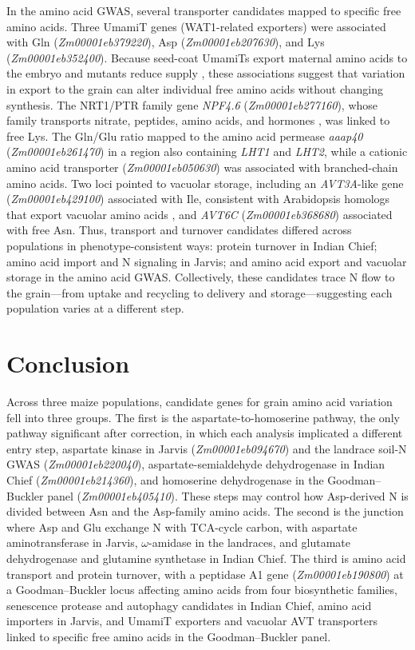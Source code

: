 \documentclass[namedate,unnumsec,webpdf,contemporary,large]{oup-authoring-template}
\begin{document}
In the amino acid GWAS, several transporter candidates mapped to specific free amino acids. Three UmamiT genes (WAT1-related exporters) were associated with Gln (\textit{Zm00001eb379220}), Asp (\textit{Zm00001eb207630}), and Lys (\textit{Zm00001eb352400}). Because seed-coat UmamiTs export maternal amino acids to the embryo and mutants reduce supply \citep{Muller2015UmamiT}, these associations suggest that variation in export to the grain can alter individual free amino acids without changing synthesis. The NRT1/PTR family gene \textit{NPF4.6} (\textit{Zm00001eb277160}), whose family transports nitrate, peptides, amino acids, and hormones \citep{Leran2014NPF}, was linked to free Lys. The Gln/Glu ratio mapped to the amino acid permease \textit{aaap40} (\textit{Zm00001eb261470}) in a region also containing \textit{LHT1} and \textit{LHT2}, while a cationic amino acid transporter (\textit{Zm00001eb050630}) was associated with branched-chain amino acids. Two loci pointed to vacuolar storage, including an \textit{AVT3A}-like gene (\textit{Zm00001eb429100}) associated with Ile, consistent with Arabidopsis homologs that export vacuolar amino acids \citep{Fujiki2017AtAVT3}, and \textit{AVT6C} (\textit{Zm00001eb368680}) associated with free Asn. Thus, transport and turnover candidates differed across populations in phenotype-consistent ways: protein turnover in Indian Chief; amino acid import and N signaling in Jarvis; and amino acid export and vacuolar storage in the amino acid GWAS. Collectively, these candidates trace N flow to the grain—from uptake and recycling to delivery and storage—suggesting each population varies at a different step.

\section{Conclusion}

Across three maize populations, candidate genes for grain amino acid variation fell into three groups. The first is the aspartate-to-homoserine pathway, the only pathway significant after correction, in which each analysis implicated a different entry step, aspartate kinase in Jarvis (\textit{Zm00001eb094670}) and the landrace soil-N GWAS (\textit{Zm00001eb220040}), aspartate-semialdehyde dehydrogenase in Indian Chief (\textit{Zm00001eb214360}), and homoserine dehydrogenase in the Goodman--Buckler panel (\textit{Zm00001eb405410}). These steps may control how Asp-derived N is divided between Asn and the Asp-family amino acids. The second is the junction where Asp and Glu exchange N with TCA-cycle carbon, with aspartate aminotransferase in Jarvis, $\omega$-amidase in the landraces, and glutamate dehydrogenase and glutamine synthetase in Indian Chief. The third is amino acid transport and protein turnover, with a peptidase A1 gene (\textit{Zm00001eb190800}) at a Goodman--Buckler locus affecting amino acids from four biosynthetic families, senescence protease and autophagy candidates in Indian Chief, amino acid importers in Jarvis, and UmamiT exporters and vacuolar AVT transporters linked to specific free amino acids in the Goodman--Buckler panel.
\end{document}
